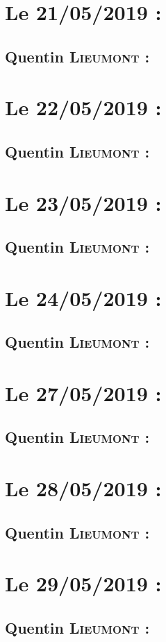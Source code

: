 \section{Le 21/05/2019 :}
    \subsection{Quentin \textsc{Lieumont} :}
        
\newpage
\section{Le 22/05/2019 :}
    \subsection{Quentin \textsc{Lieumont} :}
        
\newpage
\section{Le 23/05/2019 :}
    \subsection{Quentin \textsc{Lieumont} :}
        
\newpage
\section{Le 24/05/2019 :}
    \subsection{Quentin \textsc{Lieumont} :}
        
\newpage
\section{Le 27/05/2019 :}
    \subsection{Quentin \textsc{Lieumont} :}
        
\newpage
\section{Le 28/05/2019 :}
    \subsection{Quentin \textsc{Lieumont} :}
        
\newpage
\section{Le 29/05/2019 :}
    \subsection{Quentin \textsc{Lieumont} :}
        
